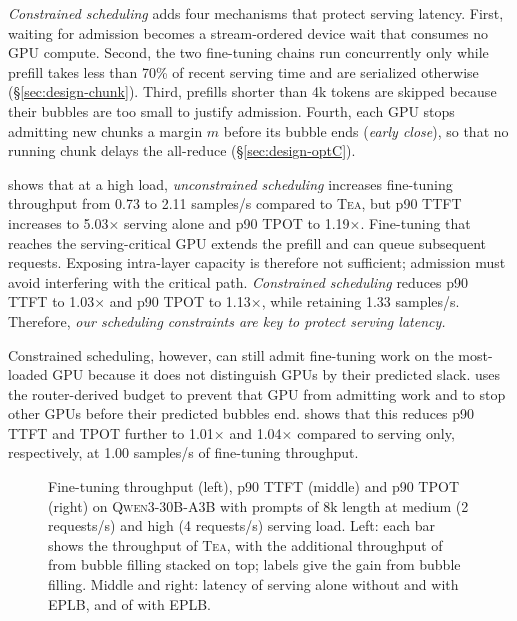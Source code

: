  \emph{Constrained scheduling} adds four mechanisms that protect serving latency. First, waiting for admission becomes a stream-ordered device wait that consumes no GPU compute.
Second, the two fine-tuning chains run concurrently only while prefill takes less than 70\% of recent serving time and are serialized otherwise (\S\ref{sec:design-chunk}).
Third, prefills shorter than 4k tokens are skipped because their bubbles are too small to justify admission.
Fourth, each GPU stops admitting new chunks a margin $m$ before its bubble ends (\emph{early close}), so that no running chunk delays the all-reduce (\S\ref{sec:design-optC}).

 shows that at a high load, \emph{unconstrained scheduling} increases fine-tuning throughput from 0.73 to 2.11 samples/s compared to \textsc{Tea}, but p90 \ac{TTFT} increases to 5.03$\times$ serving alone and p90 \ac{TPOT} to 1.19$\times$.
Fine-tuning that reaches the serving-critical GPU extends the prefill and can queue subsequent requests.
Exposing intra-layer capacity is therefore not sufficient; admission must avoid interfering with the critical path.
\emph{Constrained scheduling} reduces p90 \ac{TTFT} to 1.03$\times$ and p90 \ac{TPOT} to 1.13$\times$, while retaining 1.33 samples/s.
Therefore, \emph{our scheduling constraints are key to protect serving latency.}

Constrained scheduling, however, can still admit fine-tuning work on the most-loaded GPU because it does not distinguish GPUs by their predicted slack.
\sys uses the router-derived budget to prevent that GPU from admitting work and to stop other GPUs before their predicted bubbles end.
 shows that this reduces p90 \ac{TTFT} and \ac{TPOT} further to 1.01$\times$ and
1.04$\times$ compared to serving only, respectively, at 1.00 samples/s of fine-tuning throughput.

\begin{figure}[t]
  \centering
  \caption{Fine-tuning throughput (left), p90 \ac{TTFT} (middle) and p90 \ac{TPOT} (right) on \textsc{Qwen3-30B-A3B} with prompts of 8k length at medium (2 requests/s) and high (4 requests/s) serving load. Left: each bar shows the throughput of \textsc{Tea}, with the additional throughput of \sys from bubble filling stacked on top; labels give the gain from bubble filling. Middle and right: latency of serving alone without and with \ac{EPLB}, and of  \sys with \ac{EPLB}.}
  \label{fig:eval-eplb}
\end{figure}

